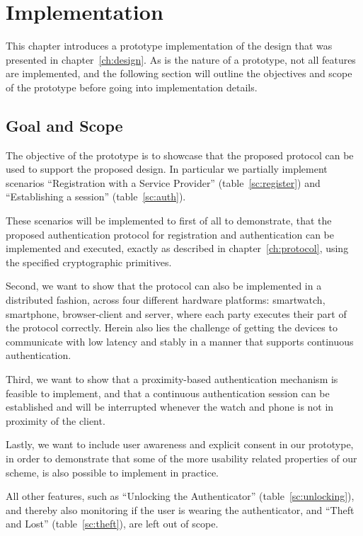 \chapter{Implementation}\label{ch:implementation}

This chapter introduces a prototype implementation of the design that was presented in chapter~\ref{ch:design}. As is the nature of a prototype, not all features are implemented, and the following section will outline the objectives and scope of the prototype before going into implementation details.

\section{Goal and Scope}

The objective of the prototype is to showcase that the proposed protocol can be used to support the proposed design. In particular we partially implement scenarios ``Registration with a Service Provider'' (table~\ref{sc:register}) and ``Establishing a session'' (table~\ref{sc:auth}). 

These scenarios will be implemented to first of all to demonstrate, that the proposed authentication protocol for registration and authentication can be implemented and executed, exactly as described in chapter~\ref{ch:protocol}, using the specified cryptographic primitives.

Second, we want to show that the protocol can also be implemented in a distributed fashion, across four different hardware platforms: smartwatch, smartphone, browser-client and server, where each party executes their part of the protocol correctly. Herein also lies the challenge of getting the devices to communicate with low latency and stably in a manner that supports continuous authentication.

Third, we want to show that a proximity-based authentication mechanism is feasible to implement, and that a continuous authentication session can be established and will be interrupted whenever the watch and phone is not in proximity of the client.

Lastly, we want to include user awareness and explicit consent in our prototype, in order to demonstrate that some of the more usability related properties of our scheme, is also possible to implement in practice.

All other features, such as ``Unlocking the Authenticator'' (table~\ref{sc:unlocking}), and thereby also monitoring if the user is wearing the \gls{authenticator}, and ``Theft and Lost'' (table~\ref{sc:theft}), are left out of scope.


